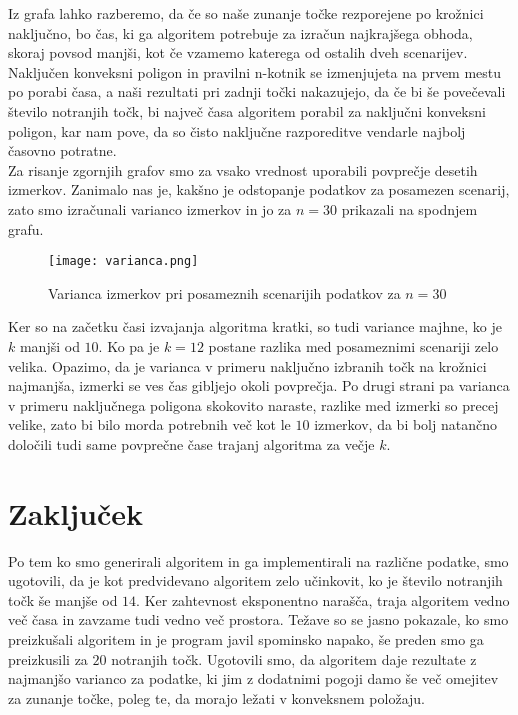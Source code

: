 \documentclass[a4paper, 11pt]{article}
\begin{document}
Iz grafa lahko razberemo, da če so naše zunanje točke rezporejene po krožnici naključno, bo čas, ki ga algoritem
potrebuje za izračun najkrajšega obhoda, skoraj povsod manjši, kot če vzamemo katerega od ostalih dveh scenarijev.
Naključen konveksni poligon in pravilni n-kotnik se izmenjujeta na prvem mestu po porabi časa, a naši rezultati pri 
zadnji točki nakazujejo, da če bi še povečevali število notranjih točk, bi največ časa algoritem porabil za naključni
konveksni poligon, kar nam pove, da so čisto naključne razporeditve vendarle najbolj časovno potratne.\\

Za risanje zgornjih grafov smo za vsako vrednost uporabili povprečje desetih izmerkov. Zanimalo nas je, kakšno je 
odstopanje podatkov za posamezen scenarij, zato smo izračunali varianco izmerkov in jo za $n=30$ prikazali na spodnjem
grafu.

\begin{figure}[h!]
    \centering
    \texttt{[image: varianca.png]}
    \caption{Varianca izmerkov pri posameznih scenarijih podatkov za $n=30$}
\end{figure}

Ker so na začetku časi izvajanja algoritma kratki, so tudi variance majhne, ko je $k$
manjši od $10$. Ko pa je $k=12$ postane razlika med posameznimi scenariji zelo velika.
Opazimo, da je varianca v primeru naključno izbranih točk na krožnici
najmanjša, izmerki se ves čas gibljejo okoli povprečja. Po drugi strani pa varianca
v primeru naključnega poligona skokovito naraste, razlike med izmerki so precej velike,
zato bi bilo morda potrebnih več kot le $10$ izmerkov, da bi bolj natančno določili tudi
same povprečne čase trajanj algoritma za večje $k$.

\section{Zaključek}
Po tem ko smo generirali algoritem in ga implementirali na različne podatke, smo ugotovili,
da je kot predvidevano algoritem zelo učinkovit, ko je število notranjih točk še manjše od $14$.
Ker zahtevnost eksponentno narašča, traja algoritem vedno več časa in zavzame tudi vedno več prostora.
Težave so se jasno pokazale, ko smo preizkušali algoritem in je program javil spominsko napako, še preden 
smo ga preizkusili za $20$ notranjih točk. Ugotovili smo, da algoritem daje rezultate z najmanjšo varianco 
za podatke, ki jim z dodatnimi pogoji damo še več omejitev za zunanje točke, poleg te, da morajo ležati v konveksnem
položaju.





\
\end{document}
